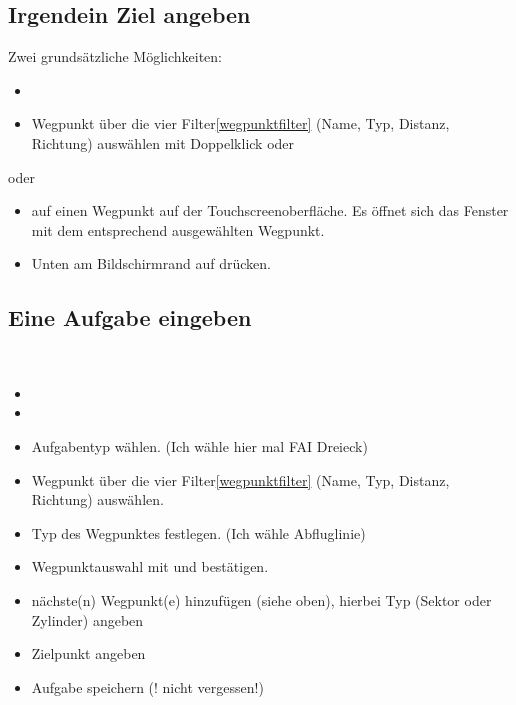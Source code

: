 \subsection{Irgendein Ziel angeben}\label{Irgendeinzieleingeben}
Zwei grundsätzliche Möglichkeiten:

\begin{itemize}
\item {}\blink~\blink~
\item Wegpunkt über die vier Filter\ref{wegpunktfilter} (Name, Typ, Distanz, Richtung) auswählen mit Doppelklick oder  \blink~
\end{itemize}

oder

\begin{itemize}
\item \dklick auf einen Wegpunkt auf der Touchscreenoberfläche. Es öffnet sich das Fenster  mit dem entsprechend ausgewählten Wegpunkt.
\item Unten am Bildschirmrand auf  drücken.
\end{itemize}


\subsection{Eine Aufgabe eingeben}\label{aufgabeeingeben}
\begin{center}
\blink~\blink~
\end{center}
\begin{itemize}
\item {}
\item {}
\item Aufgabentyp wählen. (Ich wähle hier mal \textsf{FAI Dreieck})
\item {} Wegpunkt über die vier Filter\ref{wegpunktfilter} (Name, Typ, Distanz, Richtung) auswählen.
\item Typ des Wegpunktes festlegen. (Ich wähle \textsf{Abfluglinie})
\item Wegpunktauswahl  mit   und  bestätigen.
\item nächste(n) Wegpunkt(e) hinzufügen (siehe oben), hierbei Typ (Sektor oder Zylinder) angeben
\item Zielpunkt angeben
\item Aufgabe speichern (! nicht vergessen!)
\end{itemize}

